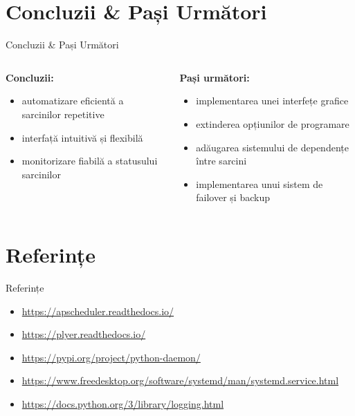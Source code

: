 \documentclass[aspectratio=169]{beamer}
\begin{document}
\section{Concluzii \& Pași Următori}
\begin{frame}{Concluzii \& Pași Următori}
  \begin{columns}
    \begin{column}{0.5\textwidth}
      \textbf{Concluzii:}
      \begin{itemize}
        \item automatizare eficientă a sarcinilor repetitive
        \item interfață intuitivă și flexibilă
        \item monitorizare fiabilă a statusului sarcinilor
      \end{itemize}
    \end{column}
    \begin{column}{0.5\textwidth}
      \textbf{Pași următori:}
      \begin{itemize}
        \item implementarea unei interfețe grafice
        \item extinderea opțiunilor de programare
        \item adăugarea sistemului de dependențe între sarcini
        \item implementarea unui sistem de failover și backup
      \end{itemize}
    \end{column}
  \end{columns}
\end{frame}

\section{Referințe}
\begin{frame}{Referințe}
  \begin{itemize}
    \item \url{https://apscheduler.readthedocs.io/}
    \item \url{https://plyer.readthedocs.io/}
    \item \url{https://pypi.org/project/python-daemon/}
    \item \url{https://www.freedesktop.org/software/systemd/man/systemd.service.html}
    \item \url{https://docs.python.org/3/library/logging.html}
  \end{itemize}
\end{frame}
\end{document}
